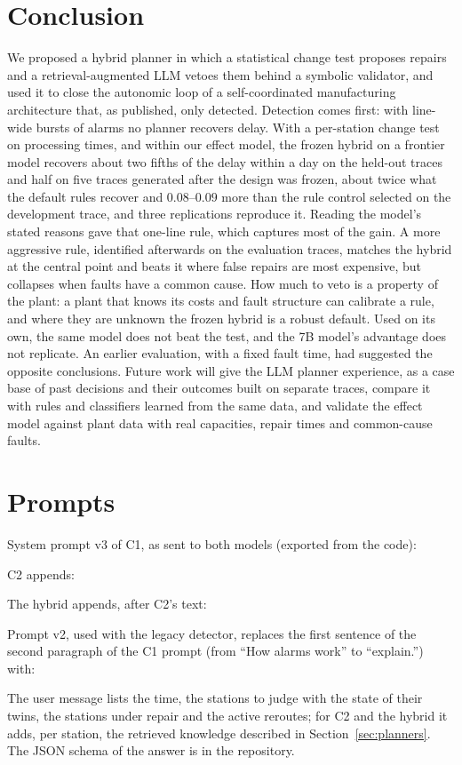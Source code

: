 \documentclass[preprint,11pt]{elsarticle}
\begin{document}
\section{Conclusion}
\label{sec:conclusion}

We proposed a hybrid planner in which a statistical change test proposes repairs and a retrieval-augmented LLM vetoes them behind a symbolic validator, and used it to close the autonomic loop of a self-coordinated manufacturing architecture that, as published, only detected. Detection comes first: with line-wide bursts of alarms no planner recovers delay. With a per-station change test on processing times, and within our effect model, the frozen hybrid on a frontier model recovers about two fifths of the delay within a day on the held-out traces and half on five traces generated after the design was frozen, about twice what the default rules recover and $0.08$--$0.09$ more than the rule control selected on the development trace, and three replications reproduce it. Reading the model's stated reasons gave that one-line rule, which captures most of the gain. A more aggressive rule, identified afterwards on the evaluation traces, matches the hybrid at the central point and beats it where false repairs are most expensive, but collapses when faults have a common cause. How much to veto is a property of the plant: a plant that knows its costs and fault structure can calibrate a rule, and where they are unknown the frozen hybrid is a robust default. Used on its own, the same model does not beat the test, and the 7B model's advantage does not replicate. An earlier evaluation, with a fixed fault time, had suggested the opposite conclusions. Future work will give the LLM planner experience, as a case base of past decisions and their outcomes built on separate traces, compare it with rules and classifiers learned from the same data, and validate the effect model against plant data with real capacities, repair times and common-cause faults.


\appendix
\section{Prompts}
\label{app:prompts}
System prompt v3 of C1, as sent to both models (exported from the code):

C2 appends:

The hybrid appends, after C2's text:

Prompt v2, used with the legacy detector, replaces the first sentence of the second paragraph of the C1 prompt (from ``How alarms work'' to ``explain.'') with:

The user message lists the time, the stations to judge with the state of their twins, the stations under repair and the active reroutes; for C2 and the hybrid it adds, per station, the retrieved knowledge described in Section~\ref{sec:planners}. The JSON schema of the answer is in the repository.



\end{document}
